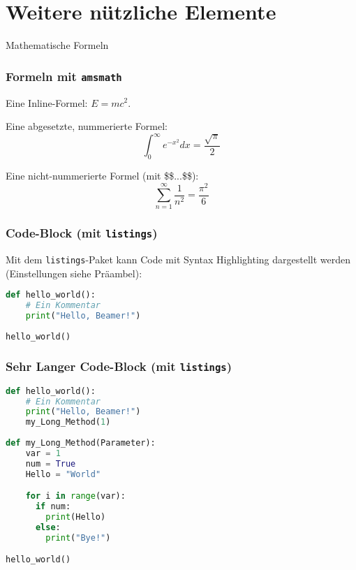 \section{Weitere nützliche Elemente}

\begin{frame}{Mathematische Formeln}
    \frametitle{Formeln mit \texttt{amsmath}}
    
    Eine Inline-Formel: $E = mc^2$.
    
    Eine abgesetzte, nummerierte Formel:
    \begin{equation}
        \int_0^\infty e^{-x^2} dx = \frac{\sqrt{\pi}}{2}
    \end{equation}
    
    Eine nicht-nummerierte Formel (mit \$\$...\$\$):
    $$ \sum_{n=1}^\infty \frac{1}{n^2} = \frac{\pi^2}{6} $$
\end{frame}

\begin{frame}[fragile] %
    \frametitle{Code-Block (mit \texttt{listings})}
    
    Mit dem \texttt{listings}-Paket kann Code mit Syntax Highlighting
    dargestellt werden (Einstellungen siehe Präambel):
    
    \begin{lstlisting}[language=Python, caption={Ein Python-Beispiel}]
def hello_world():
    # Ein Kommentar
    print("Hello, Beamer!")
    
hello_world()
    \end{lstlisting}
\end{frame}

\begin{frame}[fragile] %
    \frametitle{Sehr Langer Code-Block (mit \texttt{listings})}
    \begin{lstlisting}[basicstyle=\tiny, language=Python, caption={Ein Python Beispiel mit einer sehr langen Methode die nicht auf eine Seite passt und einer noch längeren Caption in der die Methode erklärt wird}]
def hello_world():
    # Ein Kommentar
    print("Hello, Beamer!")
    my_Long_Method(1)
    
def my_Long_Method(Parameter):
    var = 1
    num = True
    Hello = "World"

    for i in range(var):
      if num:
        print(Hello)
      else:
        print("Bye!")

hello_world()
    \end{lstlisting}
\end{frame}

